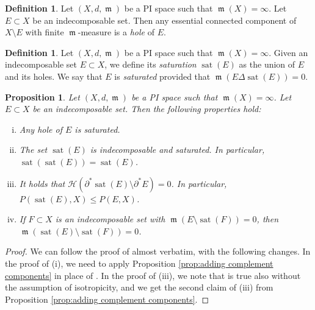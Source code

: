 \documentclass[11pt]{article}
\numberwithin{equation}{section}
\theoremstyle{plain}
\newtheorem{proposition}[equation]{Proposition}
\theoremstyle{definition}
\newtheorem{definition}[equation]{Definition}
\numberwithin{equation}{section}
\DeclareMathOperator{\frm}{\mathfrak{m}}
\DeclareMathOperator{\sat}{sat}
\begin{document}
\begin{definition}
Let $(X,d,\frm)$ be a PI space such that $\frm(X)=\infty$. Let $E\subset X$ be an indecomposable set.
Then any essential connected component of $X\setminus E$ with finite $\frm$-measure is 
a \emph{hole} of $E$.
\end{definition}

\begin{definition}
Let $(X,d,\frm)$ be a PI space such that $\frm(X)=\infty$. Given an indecomposable set $E\subset X$,
we define its \emph{saturation} $\sat(E)$ as the union of $E$ and its holes.
We say that $E$ is \emph{saturated} provided that $\frm(E\Delta \sat(E))=0$.
\end{definition}

\begin{proposition}
Let $(X,d,\frm)$ be a PI space such that $\frm(X)=\infty$. Let $E\subset X$ be an indecomposable set.
Then the following properties hold:
\begin{enumerate}[(i)]
	\item Any hole of $E$ is saturated.
	\item The set $\sat(E)$ is indecomposable and saturated. In particular,
	$\sat(\sat(E))=\sat(E)$.
	\item It holds that $\mathcal H(\partial^*\sat(E)\setminus\partial^*E)=0$.
	In particular, $P(\sat(E),X)\le P(E,X)$.
	\item If $F\subset X$ is an indecomposable set with $\frm(E\setminus \sat (F))=0$,
	then $\frm(\sat(E)\setminus \sat(F))=0$.
\end{enumerate}
\end{proposition}
\begin{proof}
We can follow the proof of \cite[Proposition 3.12]{BPR} almost verbatim, with the following changes.
In the proof of (i), we need to apply Proposition \ref{prop:adding complement components} in place of
\cite[Proposition 2.18, Proposition 2.10]{BPR}.
In the proof of (iii), we note that
\cite[Remark 2.17]{BPR} is true also without the assumption of isotropicity,
and we get the second claim of (iii) from Proposition \ref{prop:adding complement components}.

\end{proof}
\end{document}
